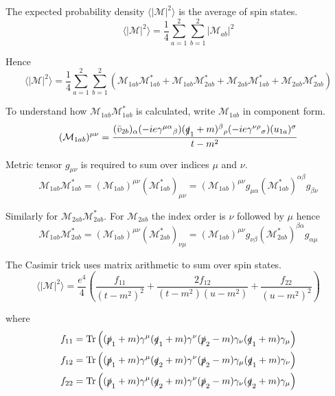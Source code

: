 The expected probability density $\langle|\mathcal M|^2\rangle$
is the average of spin states.
\begin{equation*}
\langle|\mathcal M|^2\rangle=\frac{1}{4}\sum_{a=1}^2\sum_{b=1}^2|\mathcal M_{ab}|^2
\end{equation*}

Hence
\begin{equation*}
\langle|\mathcal{M}|^2\rangle
=\frac{1}{4}\sum_{a=1}^2\sum_{b=1}^2
\left(
\mathcal M_{1ab}\mathcal M_{1ab}^*
+\mathcal M_{1ab}\mathcal M_{2ab}^*+\mathcal M_{2ab}\mathcal M_{1ab}^*
+\mathcal M_{2ab}\mathcal M_{2ab}^*
\right)
\end{equation*}

To understand how $\mathcal M_{1ab}\mathcal M_{1ab}^*$ is calculated,
write $\mathcal M_{1ab}$ in component form.
\begin{equation*}
(\mathcal M_{1ab})^{\mu\nu}=\frac{
(\bar v_{2b})_\alpha
(-ie\gamma^{\mu\alpha}{}_\beta)
(\slashed q_1+m)^\beta{}_\rho
(-ie\gamma^{\nu\rho}{}_\sigma)
(u_{1a})^\sigma}{t-m^2}
\end{equation*}

Metric tensor $g_{\mu\nu}$ is required to sum over indices $\mu$ and $\nu$.
\begin{equation*}
\mathcal M_{1ab}\mathcal M_{1ab}^*=(\mathcal M_{1ab})^{\mu\nu}(\mathcal M_{1ab}^*)_{\mu\nu}
=(\mathcal M_{1ab})^{\mu\nu}g_{\mu\alpha}(\mathcal M_{1ab}^*)^{\alpha\beta}g_{\beta\nu}
\end{equation*}

Similarly for $\mathcal M_{2ab}\mathcal M_{2ab}^*$.
For $\mathcal M_{2ab}$ the index order is $\nu$ followed by $\mu$ hence
\begin{equation*}
\mathcal M_{1ab}\mathcal M_{2ab}^*=(\mathcal M_{1ab})^{\mu\nu}(\mathcal M_{2ab}^*)_{\nu\mu}
=(\mathcal M_{1ab})^{\mu\nu}g_{\nu\beta}(\mathcal M_{2ab}^*)^{\beta\alpha}g_{\alpha\mu}
\end{equation*}

The Casimir trick uses matrix arithmetic to sum over spin states.
\begin{equation*}
\langle|\mathcal{M}|^2\rangle
=
\frac{e^4}{4}
\left(
\frac{f_{11}}{(t-m^2)^2}
+\frac{2f_{12}}{(t-m^2)(u-m^2)}
+\frac{f_{22}}{(u-m^2)^2}
\right)
\end{equation*}

where
\begin{align*}
f_{11}&=\operatorname{Tr}
\left(
(\slashed p_1+m)\gamma^\mu(\slashed q_1+m)\gamma^\nu(\slashed p_2-m)\gamma_\nu(\slashed q_1+m)\gamma_\mu
\right)
\\
f_{12}&=\operatorname{Tr}
\left(
(\slashed p_1+m)\gamma^\mu(\slashed q_2+m)\gamma^\nu(\slashed p_2-m)\gamma_\mu(\slashed q_1+m)\gamma_\nu
\right)
\\
f_{22}&=\operatorname{Tr}
\left(
(\slashed p_1+m)\gamma^\mu(\slashed q_2+m)\gamma^\nu(\slashed p_2-m)\gamma_\nu(\slashed q_2+m)\gamma_\mu
\right)
\end{align*}

